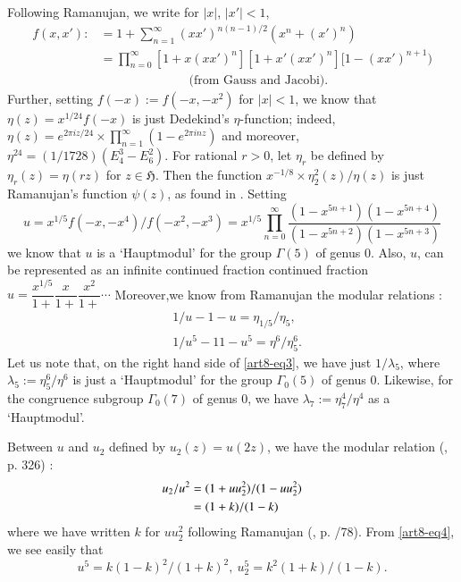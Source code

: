 Following Ramanujan, we write for $|x|$, $|x'|<1$,
\begin{align*}
f(x,x') :&= 1+\sum\limits^{\infty}_{n=1}(xx')^{n(n-1)/2}(x^{n}+(x')^{n})\\
         &= \prod\limits^{\infty}_{n=0}[1+x(xx')^{n}][1+x'(xx')^{n}][1-(xx')^{n+1})\\
         &\hspace{3cm}\text{(from Gauss and Jacobi).}
\end{align*}
Further, setting $f(-x):=f(-x,-x^{2})$ for $|x|<1$, we know that $\eta(z)=x^{1/24}f(-x)$ is just Dedekind's $\eta$-function; indeed, $\eta(z)=e^{2\pi iz/24}\times \prod\limits^{\infty}_{n=1}(1-e^{2\pi inz})$ and moreover, $\eta^{24}=(1/1728)(E^{3}_{4}-E^{2}_{6})$. For rational $r>0$, let $\eta_{r}$ be defined by $\eta_{r}(z)=\eta(rz)$ for $z\in \mathfrak{H}$. Then the function $x^{-1/8}\times \eta^{2}_{2}(z)/\eta(z)$ is just Ramanujan's function $\psi(z)$, as found in \cite{art8-key10;art8-key11}. Setting 
$$
u=x^{1/5}f(-x,-x^{4})/f(-x^{2},-x^{3})=x^{1/5}\prod\limits^{\infty}_{n=0}\frac{(1-x^{5n+1})(1-x^{5n+4})}{(1-x^{5n+2})(1-x^{5n+3})}
$$
we know that $u$ is a `Hauptmodul' for the group $\Gamma(5)$ of genus $0$. Also, $u$, can be represented as an infinite continued fraction continued fraction $u=\dfrac{x^{1/5}}{1+}\dfrac{x}{1+}\dfrac{x^{2}}{1+}\cdots$ Moreover,\pageoriginale we know from Ramanujan \cite{art8-key10} the modular relations :
\begin{align}
& 1/u-1-u=\eta_{1/5}/\eta_{5},\label{art8-key2}\\
& 1/u^{5}-11-u^{5}=\eta^{6}/\eta^{6}_{5}.\label{art8-key3}
\end{align}
Let us note that, on the right hand side of \eqref{art8-eq3}, we have just $1/\lambda_{5}$, where $\lambda_{5}:=\eta^{6}_{5}/\eta^{6}$ is just a `Hauptmodul' for the group $\Gamma_{0}(5)$ of genus $0$. Likewise, for the congruence subgroup $\Gamma_{0}(7)$ of genus $0$, we have $\lambda_{7} := \eta^{4}_{7}/\eta^{4}$ as a `Hauptmodul'.

Between $u$ and $u_{2}$ defined by $u_{2}(z)=u(2z)$, we have the modular relation (\cite{art8-key10}, p. 326) :
\begin{align}
u_{2}/u^{2} &= (1+uu^{2}_{2})/(1-uu^{2}_{2})\notag\\
          &= (1+k)/(1-k)\label{art8-key4}
\end{align}
where we have written $k$ for $uu^{2}_{2}$ following Ramanujan (\cite{art8-key11}, p. /78). From \eqref{art8-eq4}, we see easily that
\begin{equation}
u^{5}=k(1-k)^{2}/(1+k)^{2}, \ u^{5}_{2}=k^{2}(1+k)/(1-k).\label{art8-eq5}
\end{equation}


